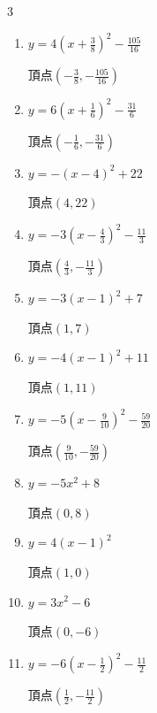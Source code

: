\begin{multicols}{3}
\begin{enumerate}
  \item $\displaystyle y=4\left( x+\frac{3}{8}\right)^{2}-\frac{105}{16}$

        $\displaystyle 頂点\left( -\frac{3}{8} , -\frac{105}{16} \right)$

  \item $\displaystyle y=6\left( x+\frac{1}{6}\right)^{2}-\frac{31}{6}$

        $\displaystyle 頂点\left( -\frac{1}{6} , -\frac{31}{6} \right)$

  \item $\displaystyle y=-\left( x-4\right)^{2}+22$

        $\displaystyle 頂点\left( 4 , 22 \right)$

  \item $\displaystyle y=-3\left( x-\frac{4}{3}\right)^{2}-\frac{11}{3}$

        $\displaystyle 頂点\left( \frac{4}{3} , -\frac{11}{3} \right)$

  \item $\displaystyle y=-3\left( x-1\right)^{2}+7$

        $\displaystyle 頂点\left( 1 , 7 \right)$

  \item $\displaystyle y=-4\left( x-1\right)^{2}+11$

        $\displaystyle 頂点\left( 1 , 11 \right)$

  \item $\displaystyle y=-5\left( x-\frac{9}{10}\right)^{2}-\frac{59}{20}$

        $\displaystyle 頂点\left( \frac{9}{10} , -\frac{59}{20} \right)$

\columnbreak %

  \item $\displaystyle y=-5x^{2}+8$

        $\displaystyle 頂点\left( 0 , 8 \right)$

  \item $\displaystyle y=4\left( x-1\right)^{2}$

        $\displaystyle 頂点\left( 1 , 0 \right)$

  \item $\displaystyle y=3x^{2}-6$

        $\displaystyle 頂点\left( 0 , -6 \right)$

  \item $\displaystyle y=-6\left( x-\frac{1}{2}\right)^{2}-\frac{11}{2}$

        $\displaystyle 頂点\left( \frac{1}{2} , -\frac{11}{2} \right)$


\end{enumerate}
\end{multicols}
